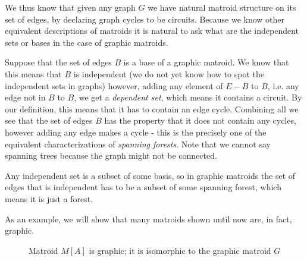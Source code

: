 We thus know that given any graph $G$ we have natural matroid structure on its set of edges, by declaring graph cycles to be circuits. Because we know other equivalent descriptions of matroids it is natural to ask what are the independent sets or bases in the case of graphic matroids. 

Suppose that the set of edges $B$ is a base of a graphic matroid. We know that this means that $B$ is independent (we do not yet know how to spot the independent sets in graphs) however, adding any element of $E-B$ to $B$, i.e. any edge not in $B$ to $B$, we get a \textit{dependent set}, which means it contains a circuit. By our definition, this means that it has to contain an edge cycle. Combining all we see that the set of edges $B$ has the property that it does not contain any cycles, however adding any edge makes a cycle - this is the precisely one of the equivalent characterizations of \textit{spanning forests}. Note that we cannot say spanning trees because the graph might not be connected. 

Any independent set is a subset of some basis, so in graphic matroids the set of edges that is independent has to be a subset of some spanning forest, which means it is just a forest.

As an example, we will show that many matroids shown until now are, in fact, graphic. 

 
\begin{figure}[H]
    \centering
    \qquad
    \caption{Matroid $M[A]$ is graphic; it is isomorphic to the graphic matroid $G$}%
    \label{graphicmatrix}%
\end{figure}


